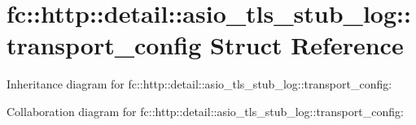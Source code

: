 \hypertarget{structfc_1_1http_1_1detail_1_1asio__tls__stub__log_1_1transport__config}{}\section{fc\+:\+:http\+:\+:detail\+:\+:asio\+\_\+tls\+\_\+stub\+\_\+log\+:\+:transport\+\_\+config Struct Reference}
\label{structfc_1_1http_1_1detail_1_1asio__tls__stub__log_1_1transport__config}


Inheritance diagram for fc\+:\+:http\+:\+:detail\+:\+:asio\+\_\+tls\+\_\+stub\+\_\+log\+:\+:transport\+\_\+config\+:


Collaboration diagram for fc\+:\+:http\+:\+:detail\+:\+:asio\+\_\+tls\+\_\+stub\+\_\+log\+:\+:transport\+\_\+config\+:
